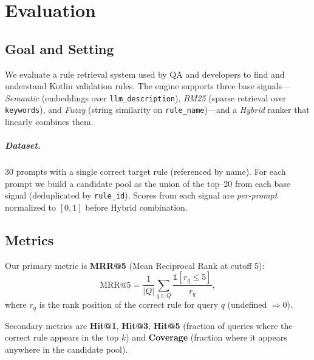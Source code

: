 \chapter{Evaluation}
\label{chap:evaluation}

\section{Goal and Setting}
\label{sec:evaluation-goal-setting}
We evaluate a rule retrieval system used by QA and developers to find and understand Kotlin validation rules. The engine supports three base signals—\emph{Semantic} (embeddings over \texttt{llm\_description}), \emph{BM25} (sparse retrieval over \texttt{keywords}), and \emph{Fuzzy} (string similarity on \texttt{rule\_name})—and a \emph{Hybrid} ranker that linearly combines them.

\paragraph{Dataset.} 30 prompts with a single correct target rule (referenced by name). For each prompt we build a candidate pool as the union of the top–20 from each base signal (deduplicated by \texttt{rule\_id}). Scores from each signal are \emph{per-prompt} normalized to $[0,1]$ before Hybrid combination.

\section{Metrics}
\label{sec:evaluation-metrics}
Our primary metric is \textbf{MRR@5} (Mean Reciprocal Rank at cutoff 5):
\[
\mathrm{MRR@5}=\frac{1}{|Q|}\sum_{q\in Q} \frac{\mathbb{1}[r_q\le 5]}{r_q},
\]
where $r_q$ is the rank position of the correct rule for query $q$ (undefined $\Rightarrow 0$).

Secondary metrics are \textbf{Hit@1}, \textbf{Hit@3}, \textbf{Hit@5} (fraction of queries where the correct rule appears in the top $k$) and \textbf{Coverage} (fraction where it appears anywhere in the candidate pool).

